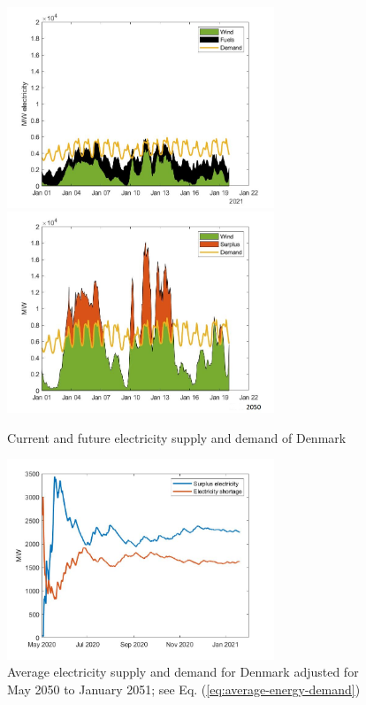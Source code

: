 \documentclass{ECOS_2021}
\begin{document}
\begin{figure}[H]
\includegraphics[width=8cm]{denmark_elec_jan2021}\includegraphics[width=8cm]{supply_demand_jan2050_dk}

\caption{\label{fig:Current-and-future}Current and future electricity supply
and demand of Denmark }
\end{figure}

\begin{figure}[H]
\includegraphics[width=8cm]{supply_demand_six_month_dk}

\caption{\label{fig:Average-electricity-supply}Average electricity supply
and demand for Denmark adjusted for May 2050 to January 2051; see
Eq. (\ref{eq:average-energy-demand})}
\end{figure}
\end{document}
